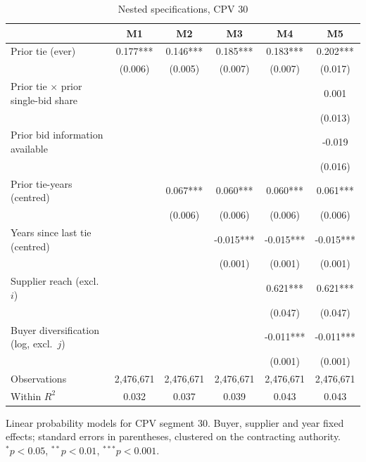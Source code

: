 \begin{table}[htbp]
\centering
\begin{threeparttable}
\caption{Nested specifications, CPV 30}
\label{tab:panel-nested-30}
\begin{tabular}{lccccc}
\toprule
 & M1 & M2 & M3 & M4 & M5 \\
\midrule
Prior tie (ever) & 0.177*** & 0.146*** & 0.185*** & 0.183*** & 0.202*** \\
 & (0.006) & (0.005) & (0.007) & (0.007) & (0.017) \\
Prior tie $\times$ prior single-bid share &  &  &  &  & 0.001 \\
 &  &  &  &  & (0.013) \\
Prior bid information available &  &  &  &  & -0.019 \\
 &  &  &  &  & (0.016) \\
Prior tie-years (centred) &  & 0.067*** & 0.060*** & 0.060*** & 0.061*** \\
 &  & (0.006) & (0.006) & (0.006) & (0.006) \\
Years since last tie (centred) &  &  & -0.015*** & -0.015*** & -0.015*** \\
 &  &  & (0.001) & (0.001) & (0.001) \\
Supplier reach (excl.\ $i$) &  &  &  & 0.621*** & 0.621*** \\
 &  &  &  & (0.047) & (0.047) \\
Buyer diversification (log, excl.\ $j$) &  &  &  & -0.011*** & -0.011*** \\
 &  &  &  & (0.001) & (0.001) \\
\midrule
Observations & 2,476,671 & 2,476,671 & 2,476,671 & 2,476,671 & 2,476,671 \\
Within $R^2$ & 0.032 & 0.037 & 0.039 & 0.043 & 0.043 \\
\bottomrule
\end{tabular}
\begin{tablenotes}\small\item Linear probability models for CPV segment 30. Buyer, supplier and year fixed effects; standard errors in parentheses, clustered on the contracting authority. $^{*}p<0.05$, $^{**}p<0.01$, $^{***}p<0.001$.\end{tablenotes}
\end{threeparttable}
\end{table}